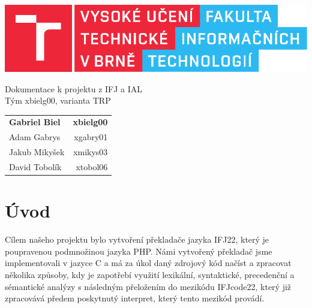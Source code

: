 \documentclass[a4paper, 12pt]{article}
\begin{document}
    \begin{titlepage}
		\centering

        \includegraphics{src/fitlogo.pdf}


        {\Huge Dokumentace k projektu z IFJ a IAL\\[0.4em]
            \LARGE Tým xbielg00, varianta TRP}


        \begin{table}[H]
            \hfill
            \begin{tabularx}{0.5\textwidth}{Xr}
                \textbf{Gabriel Biel} & \textbf{xbielg00} \\
                Adam Gabrys & xgabry01 \\
                Jakub Mikyšek & xmikys03 \\
                David Tobolík & xtobol06 \\
            \end{tabularx}
        \end{table}
	\end{titlepage}

    \tableofcontents
    \newpage

    \section{Úvod}
        Cílem našeho projektu bylo vytvoření překladače jazyka IFJ22, který je poupravenou podmnožinou jazyka PHP. Námi vytvořený překladač jsme implementovali v jazyce C a  má za úkol daný zdrojový kód načíst a zpracovat několika způsoby, kdy je zapotřebí využití lexikální, syntaktické, precedenční a sémantické analýzy s následným přeložením do mezikódu IFJcode22, který již zpracovává předem poskytnutý interpret, který tento mezikód provádí.
\end{document}
